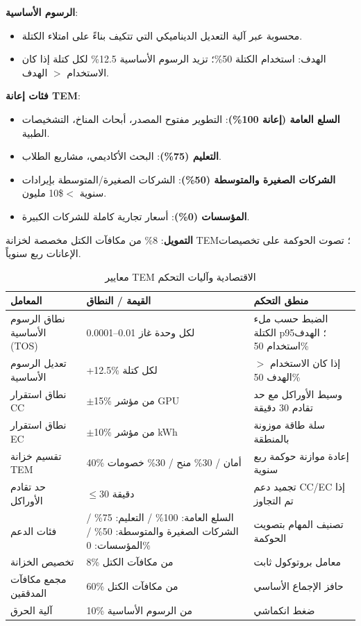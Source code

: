 \documentclass[11pt]{article}
\begin{document}
\textbf{الرسوم الأساسية}:
\begin{itemize}[noitemsep]
  \item محسوبة عبر آلية التعديل الديناميكي التي تتكيف بناءً على امتلاء الكتلة.
  \item الهدف: استخدام الكتلة 50\%؛ تزيد الرسوم الأساسية 12.5\% لكل كتلة إذا كان الاستخدام $>$ الهدف.
\end{itemize}

\textbf{فئات إعانة TEM}:
\begin{itemize}[noitemsep]
  \item \textbf{السلع العامة (إعانة 100\%)}: التطوير مفتوح المصدر، أبحاث المناخ، التشخيصات الطبية.
  \item \textbf{التعليم (75\%)}: البحث الأكاديمي، مشاريع الطلاب.
  \item \textbf{الشركات الصغيرة والمتوسطة (50\%)}: الشركات الصغيرة/المتوسطة بإيرادات سنوية $<$\$10 مليون.
  \item \textbf{المؤسسات (0\%)}: أسعار تجارية كاملة للشركات الكبيرة.
\end{itemize}

\textbf{التمويل}: 8\% من مكافآت الكتل مخصصة لخزانة TEM؛ تصوت الحوكمة على تخصيصات الإعانات ربع سنوياً.

\begin{table}[H]
\centering
\caption{معايير TEM الاقتصادية وآليات التحكم}
\label{tab:tem-parameters}
\begin{tabular}{@{}p{}p{}p{}@{}}
\toprule
\textbf{المعامل} & \textbf{القيمة / النطاق} & \textbf{منطق التحكم} \\ \midrule
نطاق الرسوم الأساسية (TOS) & 0.0001--0.01 لكل وحدة غاز & الضبط حسب ملء الكتلة p95؛ الهدف استخدام 50\% \\
تعديل الرسوم الأساسية & +12.5\% لكل كتلة & إذا كان الاستخدام $>$ الهدف 50\% \\
نطاق استقرار CC & $\pm$15\% من مؤشر GPU & وسيط الأوراكل مع حد تقادم 30 دقيقة \\
نطاق استقرار EC & $\pm$10\% من مؤشر kWh & سلة طاقة موزونة بالمنطقة \\
تقسيم خزانة TEM & 40\% أمان / 30\% منح / 30\% خصومات & إعادة موازنة حوكمة ربع سنوية \\
حد تقادم الأوراكل & $\le$30 دقيقة & تجميد دعم CC/EC إذا تم التجاوز \\
فئات الدعم & السلع العامة: 100\% / التعليم: 75\% / الشركات الصغيرة والمتوسطة: 50\% / المؤسسات: 0\% & تصنيف المهام بتصويت الحوكمة \\
تخصيص الخزانة & 8\% من مكافآت الكتل & معامل بروتوكول ثابت \\
مجمع مكافآت المدققين & 60\% من مكافآت الكتل & حافز الإجماع الأساسي \\
آلية الحرق & 10\% من الرسوم الأساسية & ضغط انكماشي \\
\bottomrule
\end{tabular}
\end{table}
\end{document}
